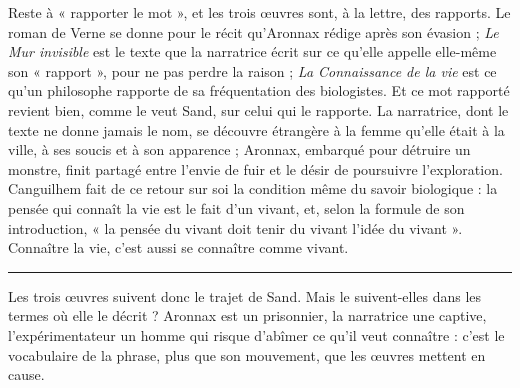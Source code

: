 \documentclass[11pt,a4paper]{article}
\begin{document}
Reste à « rapporter le mot », et les trois œuvres sont, à la lettre, des rapports. Le roman de Verne se donne pour le récit qu'Aronnax rédige après son évasion ; \emph{Le Mur invisible} est le texte que la narratrice écrit sur ce qu'elle appelle elle-même son « rapport », pour ne pas perdre la raison ; \emph{La Connaissance de la vie} est ce qu'un philosophe rapporte de sa fréquentation des biologistes. Et ce mot rapporté revient bien, comme le veut Sand, sur celui qui le rapporte. La narratrice, dont le texte ne donne jamais le nom, se découvre étrangère à la femme qu'elle était à la ville, à ses soucis et à son apparence ; Aronnax, embarqué pour détruire un monstre, finit partagé entre l'envie de fuir et le désir de poursuivre l'exploration. Canguilhem fait de ce retour sur soi la condition même du savoir biologique : la pensée qui connaît la vie est le fait d'un vivant, et, selon la formule de son introduction, « la pensée du vivant doit tenir du vivant l'idée du vivant ». Connaître la vie, c'est aussi se connaître comme vivant.

\begin{center}\rule{0.5\linewidth}{0.5pt}\end{center}

Les trois œuvres suivent donc le trajet de Sand. Mais le suivent-elles dans les termes où elle le décrit ? Aronnax est un prisonnier, la narratrice une captive, l'expérimentateur un homme qui risque d'abîmer ce qu'il veut connaître : c'est le vocabulaire de la phrase, plus que son mouvement, que les œuvres mettent en cause.
\end{document}
